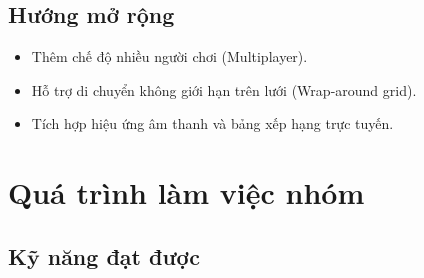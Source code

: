 \documentclass[a4paper, 12pt]{article}
\begin{document}
\subsection{Hướng mở rộng}
\begin{itemize}
    \item Thêm chế độ nhiều người chơi (Multiplayer).
    \item Hỗ trợ di chuyển không giới hạn trên lưới (Wrap-around grid).
    \item Tích hợp hiệu ứng âm thanh và bảng xếp hạng trực tuyến.
\end{itemize}




\section{Quá trình làm việc nhóm}

\subsection{Kỹ năng đạt được}

\end{document}
